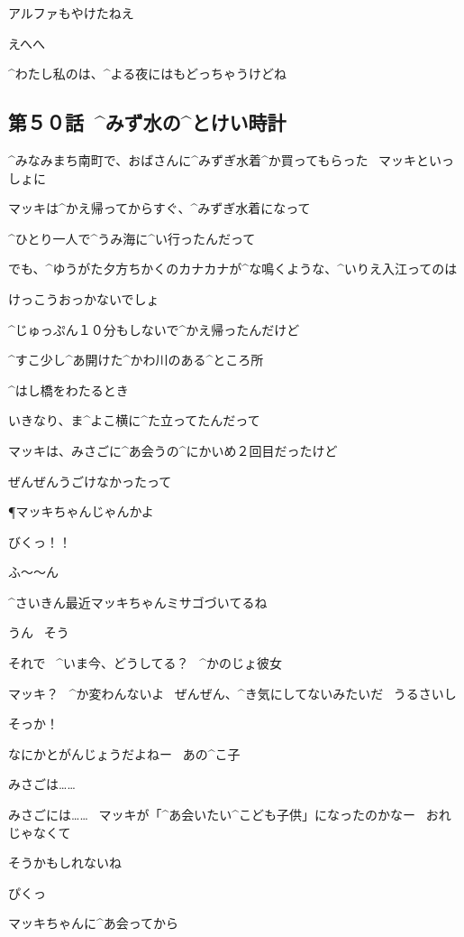 \T アルファもやけたねえ

\A えへへ

\A ^{わたし}{私}のは、^{よる}{夜}にはもどっちゃうけどね


\subsection{第５０話\ ^{みず}{水}の^{とけい}{時計}}

\page[90]
\T ^{みなみまち}{南町}で、おばさんに^{みずぎ}{水着}^{か}{買}ってもらった
\ マッキといっしょに

\T マッキは^{かえ}{帰}ってからすぐ、^{みずぎ}{水着}になって

\T ^{ひとり}{一人}で^{うみ}{海}に^{い}{行}ったんだって

\page
\T でも、^{ゆうがた}{夕方}ちかくのカナカナが^{な}{鳴}くような、^{いりえ}{入江}ってのは

\T けっこうおっかないでしょ

\T ^{じゅっぷん}{１０分}もしないで^{かえ}{帰}ったんだけど

\T ^{すこ}{少}し^{あ}{開}けた^{かわ}{川}のある^{ところ}{所}

\T ^{はし}{橋}をわたるとき

\page
\T いきなり、ま^{よこ}{横}に^{た}{立}ってたんだって

\T マッキは、みさごに^{あ}{会}うの^{にかいめ}{２回目}だったけど

\page
\T ぜんぜんうごけなかったって

\P マッキちゃんじゃんかよ

\M びくっ！！

\page
\A ふ〜〜ん

\A ^{さいきん}{最近}マッキちゃんミサゴづいてるね

\T うん
\ そう

\page
\A それで
\ ^{いま}{今}、どうしてる？
\ ^{かのじょ}{彼女}

\T マッキ？
\ ^{か}{変}わんないよ
\ ぜんぜん、^{き}{気}にしてないみたいだ
\ うるさいし

\A そっか！

\A なにかとがんじょうだよねー
\ あの^{こ}{子}

\T みさごは……

\page
\T みさごには……
\ マッキが「^{あ}{会}いたい^{こども}{子供}」になったのかなー
\ おれじゃなくて

\A そうかもしれないね

\T ぴくっ

\page
\A マッキちゃんに^{あ}{会}ってから

